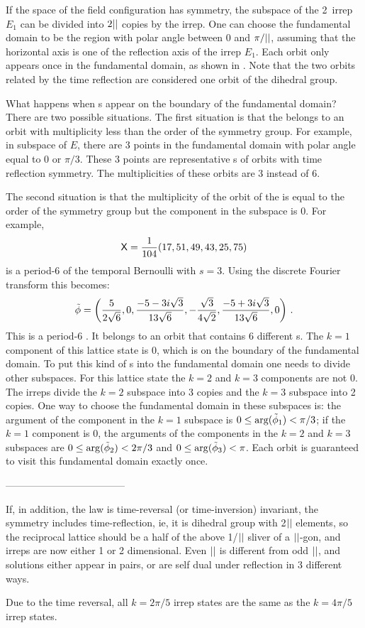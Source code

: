 If the space of the field configuration has \Dn{\cl{}} symmetry,
the subspace of the 2\dmn\ irrep $E_1$ can be divided
into $2{||}$ copies by the irrep. One can choose the fundamental domain to be the region
with polar angle between 0 and $\pi/{||}$, assuming that the horizontal axis is one of the
reflection axis of the irrep $E_1$. Each orbit only appears once in the fundamental domain,
as shown in . Note that the two orbits related by
the time reflection are considered one orbit of the dihedral group.

What happens when {\lattstate}s appear on the boundary of the fundamental domain?
There are two possible situations. The first situation is that the {\lattstate} belongs to an
orbit with multiplicity less than the order of the symmetry group. For example,
in  subspace of $E$, there are 3 points in the fundamental domain
with polar angle equal to 0 or $\pi/3$. These 3 points are representative {\lattstate}s of orbits
with time reflection symmetry. The multiplicities of these orbits are 3 instead of 6.

The second situation is that the multiplicity of
the orbit of the {\lattstate} is equal to the order of the symmetry group
but the component in the subspace is 0. For example,
\[
\mathsf{X} = \frac{1}{104} (17, 51, 49, 43, 25, 75)
\]
is a period-6 {\lattstate} of the temporal Bernoulli
 with $s=3$. Using the discrete Fourier transform
this {\lattstate} becomes:
\[
\tilde{\phi} =
\left(\frac{5}{2 \sqrt{6}},0,\frac{-5-3 i \sqrt{3}}{13
   \sqrt{6}},-\frac{\sqrt{3}}{4\sqrt{2}},\frac{-5+3 i \sqrt{3}}{13 \sqrt{6}},0\right) \,.
\]
This is a period-6 {\lattstate}. It belongs to an orbit that
contains 6 different {\lattstate}s. The $k=1$ component of this lattice
state is 0, which is on the boundary of the fundamental domain. To put this kind of
{\lattstate}s into the fundamental domain one needs to divide other subspaces.
For this lattice state the $k=2$ and $k=3$ components are not 0. The irreps divide
the $k=2$ subspace into 3 copies and the $k=3$ subspace into 2 copies. One way to
choose the fundamental domain in these subspaces is: the argument of the component
in the $k=1$ subspace is $0\leq\arg(\tilde{\phi}_{1})<\pi/3$; if the $k=1$ component
is 0, the arguments of the components
in the $k=2$ and $k=3$ subspaces are $0\leq\arg(\tilde{\phi}_{2})<2\pi/3{}$ and
$0\leq\arg(\tilde{\phi}_{3})<\pi$. Each orbit is guaranteed to visit this fundamental
domain exactly once.

\bigskip
------------------------------------

If, in addition, the law is time-reversal (or time-inversion) invariant,
the symmetry includes time-reflection, ie, it is dihedral group 
with 2${||}$ elements, so the reciprocal lattice should be a half of the
above 1/${||}$ sliver of a ${||}$-gon, and irreps are now either 1 or 2
dimensional. Even ${||}$ is different from odd ${||}$, and solutions either appear
in pairs, or are self dual under reflection in 3 different ways.

Due to the time
reversal, all $k={2\pi}/{5}$ irrep states are the same as the
$k={4\pi}/{5}$ irrep states.
